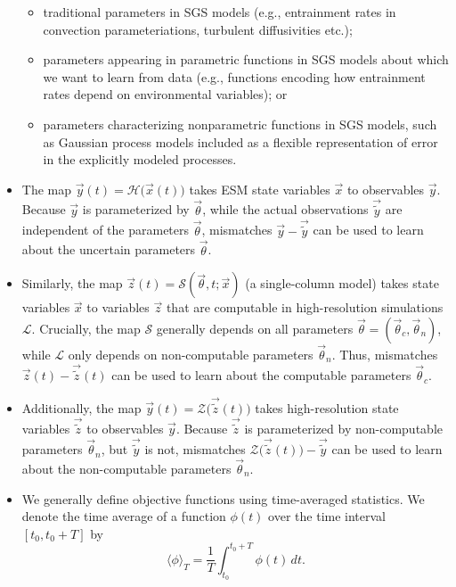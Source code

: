 \documentclass{article}
\begin{document}
\begin{itemize}
\begin{itemize}
            \item traditional parameters in SGS models (e.g., entrainment rates in convection parameteriations, turbulent diffusivities etc.);
            \item parameters appearing in parametric functions in SGS models about which we want to learn from data (e.g., functions encoding how entrainment rates depend on environmental variables); or
            \item parameters characterizing nonparametric functions in SGS models, such as Gaussian process models \citep{Rasmussen06a} included as a flexible representation of error in the explicitly modeled processes. 
        \end{itemize} 
    \item The map $\vec{y}(t)=\mathcal{H}\bigl(\vec{x}(t)\bigr)$ takes ESM state variables $\vec{x}$ to observables $\vec{y}$. Because $\vec{y}$ is parameterized by $\vec{\theta}$, while the actual observations $\vec{\tilde y}$ are independent of the parameters $\vec{\theta}$, mismatches $\vec{y} - \vec{\tilde y}$ can be used to learn about the uncertain parameters $\vec{\theta}$. 
    \item Similarly, the map $\vec{z}(t) = \mathcal{S}(\vec{\theta},t; \vec{x})$ (a single-column model) takes state variables $\vec{x}$ to variables $\vec{z}$ that are computable in high-resolution simulations $\mathcal{L}$. Crucially, the map $\mathcal{S}$ generally depends on all parameters $\vec{\theta}=(\vec{\theta}_c, \vec{\theta}_n)$, while $\mathcal{L}$ only depends on non-computable parameters $\vec{\theta}_n$. Thus, mismatches $\vec{z}(t) - \vec{\tilde z}(t)$ can be used to learn about the computable parameters $\vec{\theta}_c$.
    \item Additionally, the map $\vec{y}(t) = \mathcal{Z}\bigl(\vec{\tilde z}(t)\bigr)$ takes high-resolution state variables $\vec{\tilde z}$ to observables $\vec{y}$. Because $\vec{\tilde z}$ is parameterized by non-computable parameters $\vec{\theta}_n$, but $\vec{\tilde y}$ is not, mismatches $\mathcal{Z}\bigl(\vec{\tilde z}(t)\bigr) - \vec{\tilde y}$ can be used to learn about the non-computable parameters $\vec{\theta}_n$.
    \item We generally define objective functions using time-averaged statistics. We denote the time average of a function $\phi(t)$ over the time interval $[t_0,t_0+T]$ by
    \begin{equation}\label{e:Tavg}
    \langle \phi \rangle_T = \frac{1}{T} \int_{t_0}^{t_0+T} \phi(t) \, dt.
    \end{equation}

\end{itemize}
\end{document}
